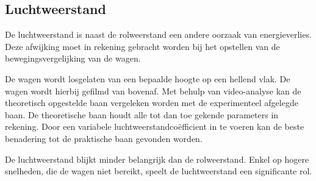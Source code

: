 \subsection{Luchtweerstand}
De luchtweerstand is naast de rolweerstand een andere oorzaak van 
energieverlies. Deze afwijking moet in rekening gebracht worden bij het 
opstellen van de bewegingsvergelijking van de wagen.

De wagen wordt losgelaten van een bepaalde hoogte op een hellend vlak. De wagen 
wordt hierbij gefilmd van bovenaf. Met behulp van video-analyse  kan de 
theoretisch opgestelde baan vergeleken worden met de experimenteel afgelegde 
baan. De theoretische baan houdt alle tot dan toe gekende parameters in 
rekening. Door een variabele luchtweerstandcoëfficient in te voeren kan de beste 
benadering tot de praktische baan gevonden worden.

De luchtweerstand blijkt minder belangrijk dan de rolweerstand. Enkel op hogere 
snelheden, die de wagen niet bereikt, speelt de luchtweerstand een significante 
rol.
